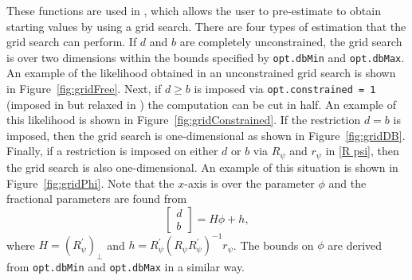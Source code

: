 \documentclass[article]{jss}
\newcommand{\fct}[1]{\code{#1()}}
\begin{document}
These functions are used in \fct{LikeGrid.m}, which allows the user to pre-estimate to obtain starting values by using a grid search. There are four types of estimation that the grid search can perform. If $d$ and $b$ are completely unconstrained, the grid search is over two dimensions within the bounds specified by \verb|opt.dbMin| and \verb|opt.dbMax|. An example of the likelihood obtained in an unconstrained grid search is shown in Figure~\ref{fig:gridFree}. Next, if $d\ge b$ is imposed via \verb|opt.constrained = 1| (imposed in \cite{johansen2012likelihood} but relaxed in \cite{JN2018}) the computation can be cut in half. An example of this likelihood is shown in Figure~\ref{fig:gridConstrained}. If the restriction $d=b$ is imposed, then the grid search is one-dimensional as shown in Figure~\ref{fig:gridDB}. Finally, if a restriction is imposed on either $d$ or $b$ via $R_\psi$ and $r_\psi$ in \eqref{R psi}, then the grid search is also one-dimensional. An example of this situation is shown in Figure~\ref{fig:gridPhi}. Note that the $x$-axis is over the parameter $\phi$ and the fractional parameters are found from
\begin{equation}
  \begin{bmatrix}
    d \\ b
  \end{bmatrix}
  = H\phi + h,
\end{equation}
where $H = (R_{\psi}^{\prime})_\perp$ and $h = R_{\psi}^{\prime} (R_\psi R_{\psi}^{\prime})^{-1} r_\psi$. The bounds on $\phi$ are derived from \verb|opt.dbMin| and \verb|opt.dbMax| in a similar way.
\end{document}
